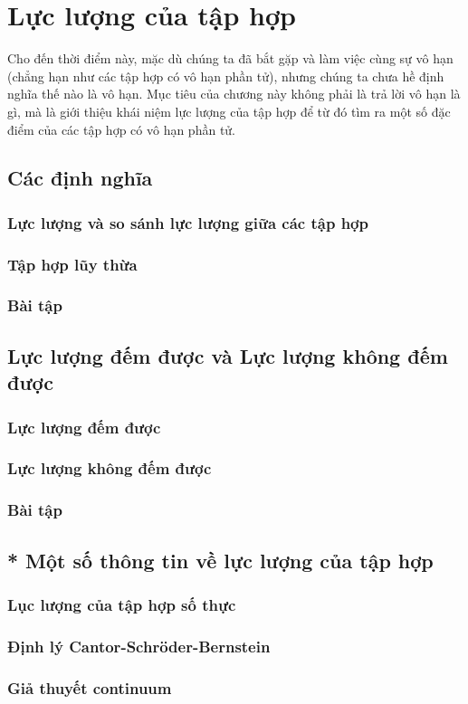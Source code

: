 \chapter{Lực lượng của tập hợp}\label{chapter:cardinality}

Cho đến thời điểm này, mặc dù chúng ta đã bắt gặp và làm việc cùng sự vô hạn (chẳng hạn như các tập hợp có vô hạn phần tử), nhưng chúng ta chưa hề định nghĩa thế nào là vô hạn. Mục tiêu của chương này không phải là trả lời vô hạn là gì, mà là giới thiệu khái niệm lực lượng của tập hợp để từ đó tìm ra một số đặc điểm của các tập hợp có vô hạn phần tử.

\section{Các định nghĩa}

\subsection{Lực lượng và so sánh lực lượng giữa các tập hợp}

\subsection{Tập hợp lũy thừa}

\subsection{Bài tập}

\section{Lực lượng đếm được và Lực lượng không đếm được}

\subsection{Lực lượng đếm được}

\subsection{Lực lượng không đếm được}

\subsection{Bài tập}

\section{* Một số thông tin về lực lượng của tập hợp}

\subsection{Lục lượng của tập hợp số thực}

\subsection{Định lý Cantor-Schr\"{o}der-Bernstein}

\subsection{Giả thuyết continuum}
